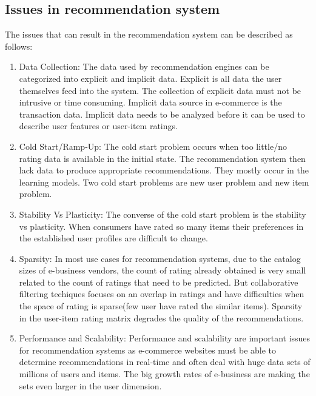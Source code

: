 \subsection{Issues in recommendation system}
The issues \cite{recommend} that can result in the recommendation system can be described as follows:
\begin{enumerate}
\item Data Collection: The data used by recommendation engines can be categorized into explicit and implicit data. Explicit is all data the user themselves feed into the system. The collection of explicit data must not be intrusive or time consuming. Implicit data source in e-commerce is the transaction data. Implicit data needs to be analyzed before it can be used to describe user features or user-item ratings.
\item Cold Start/Ramp-Up: The cold start problem occurs when too little/no rating data is available in the initial state. The recommendation system then lack data to produce appropriate recommendations. They mostly occur in the learning models. Two cold start problems are new user problem and new item problem.
\item Stability Vs Plasticity: The converse of the cold start problem is the stability vs plasticity. When consumers have rated so many items their preferences in the established user profiles are difficult to change.
\item Sparsity: In most use cases for recommendation systems, due to the catalog sizes of e-business vendors, the count of rating already obtained is very small related to the count of ratings that need to be predicted. But collaborative filtering techiques focuses on an overlap in ratings and have difficulties when the space of rating is sparse(few user have rated the similar items). Sparsity in the user-item rating matrix degrades the quality of the recommendations.
\item Performance and Scalability: Performance and scalability are important issues for recommendation systems as e-commerce websites must be able to determine recommendations in real-time and often deal with huge data sets of millions of users and items. The big growth rates of e-business are making the sets even larger in the user dimension.

\end{enumerate}
